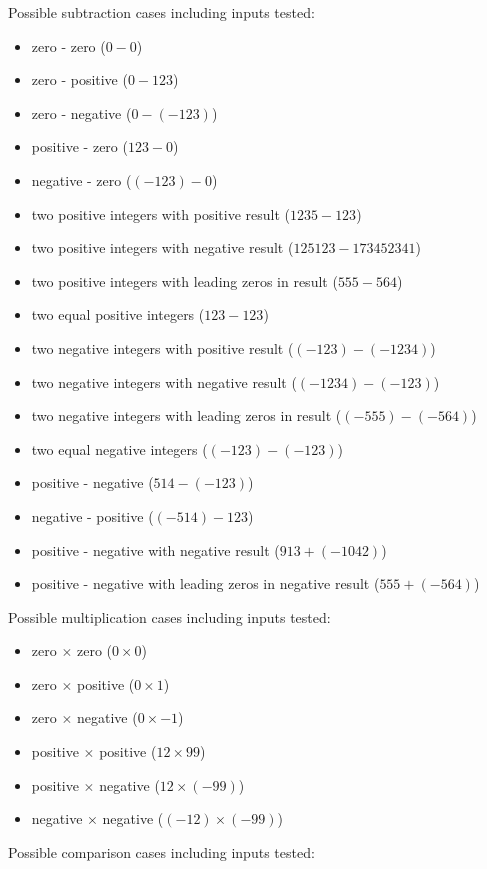 \documentclass[12pt]{article}
\begin{document}
Possible subtraction cases including inputs tested:
\begin{itemize}
    \item zero - zero ($0 - 0$)
    \item zero - positive ($0 - 123$)
    \item zero - negative ($0 - (-123)$)
    \item positive - zero ($123 - 0$)
    \item negative - zero ($(-123) - 0$)
    \item two positive integers with positive result ($1235 - 123$)
    \item two positive integers with negative result ($125123 - 173452341$)
    \item two positive integers with leading zeros in result ($555 - 564$)
    \item two equal positive integers ($123 - 123$)
    \item two negative integers with positive result ($(-123) - (-1234)$)
    \item two negative integers with negative result ($(-1234) - (-123)$)
    \item two negative integers with leading zeros in result ($(-555) - (-564)$)
    \item two equal negative integers ($(-123) - (-123)$)
    \item positive - negative ($514 - (-123)$) 
    \item negative - positive ($(-514) - 123$)
    \item positive - negative with negative result ($913 + (-1042)$) 
    \item positive - negative with leading zeros in negative result ($555 + (-564)$)
\end{itemize}
Possible multiplication cases including inputs tested:
\begin{itemize}
    \item zero $\times$ zero ($0 \times 0$)
    \item zero $\times$ positive ($0 \times 1$)
    \item zero $\times$ negative ($0 \times -1$)
    \item positive $\times$ positive ($12 \times 99$)
    \item positive $\times$ negative ($12 \times (-99)$)
    \item negative $\times$ negative ($(-12) \times (-99)$)
\end{itemize}
Possible comparison cases including inputs tested:
\end{document}
